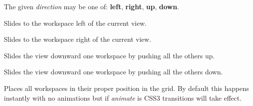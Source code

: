 \documentclass[letterpaper,10pt,openany]{sphinxmanual}
\begin{document}
\begin{fulllineitems}
\begin{fulllineitems}
\begin{fulllineitems}
The given \emph{direction} may be one of:  \textbf{left}, \textbf{right}, \textbf{up}, \textbf{down}.

\end{fulllineitems}



\begin{fulllineitems}
\label{Developer/js_gateone:GateOne.Visual.slideLeft}
Slides to the workspace left of the current view.

\end{fulllineitems}



\begin{fulllineitems}
\label{Developer/js_gateone:GateOne.Visual.slideRight}
Slides to the workspace right of the current view.

\end{fulllineitems}



\begin{fulllineitems}
\label{Developer/js_gateone:GateOne.Visual.slideDown}
Slides the view downward one workspace by pushing all the others up.

\end{fulllineitems}



\begin{fulllineitems}
\label{Developer/js_gateone:GateOne.Visual.slideUp}
Slides the view downward one workspace by pushing all the others down.

\end{fulllineitems}



\begin{fulllineitems}
\label{Developer/js_gateone:GateOne.Visual.resetGrid}
Places all workspaces in their proper position in the grid.  By default this happens instantly with no animations but if \emph{animate} is  CSS3 transitions will take effect.

\end{fulllineitems}




\end{fulllineitems}
\end{fulllineitems}
\end{document}
